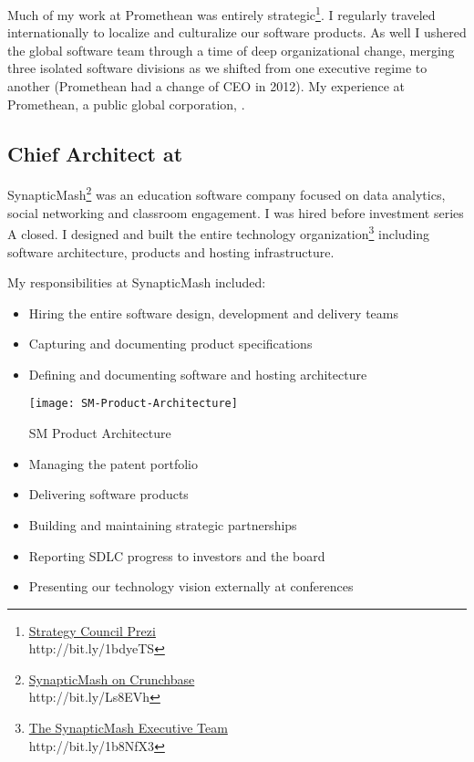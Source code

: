 Much of my work at Promethean was entirely strategic\footnote{\href{http://prezi.com/v-jhcxlibwka/?utm_campaign=share&utm_medium=copy&rc=ex0share}{Strategy Council Prezi}\\ http://bit.ly/1bdyeTS}.  I regularly traveled internationally to localize and culturalize our software products.  As well I ushered the global software team through a time of deep organizational change, merging three isolated software divisions as we shifted from one executive regime to another (Promethean had a change of CEO in 2012).  My experience at Promethean, a public global corporation, .

\subsection{\textbf{Chief Architect} at  \shyears{[2008-2010]}}
SynapticMash\footnote{\href{http://www.crunchbase.com/company/synapticmash}{SynapticMash on Crunchbase}\\ http://bit.ly/Ls8EVh} was an education software company focused on data analytics, social networking and classroom engagement.  I was hired before investment series A closed.  I designed and built the entire technology organization\footnote{\href{http://synapticmash.com/index.php/about}{The SynapticMash Executive Team}\\ http://bit.ly/1b8NfX3} including software architecture, products and hosting infrastructure.

My responsibilities at SynapticMash included:
\begin{itemize}
\itemsep-0.5em
\item{Hiring the entire software design, development and delivery teams}
\item{Capturing and documenting product specifications}
\item{Defining and documenting software and hosting architecture}
\begin{marginfigure}%
  \texttt{[image: SM-Product-Architecture]}
  \caption{SM Product Architecture}
  \label{fig:SM-Product-Architecture}
\end{marginfigure}
\item{Managing the patent portfolio}
\item{Delivering software products}
\item{Building and maintaining strategic partnerships}
\item{Reporting SDLC progress to investors and the board}
\item{Presenting our technology vision externally at conferences}
\end{itemize}

